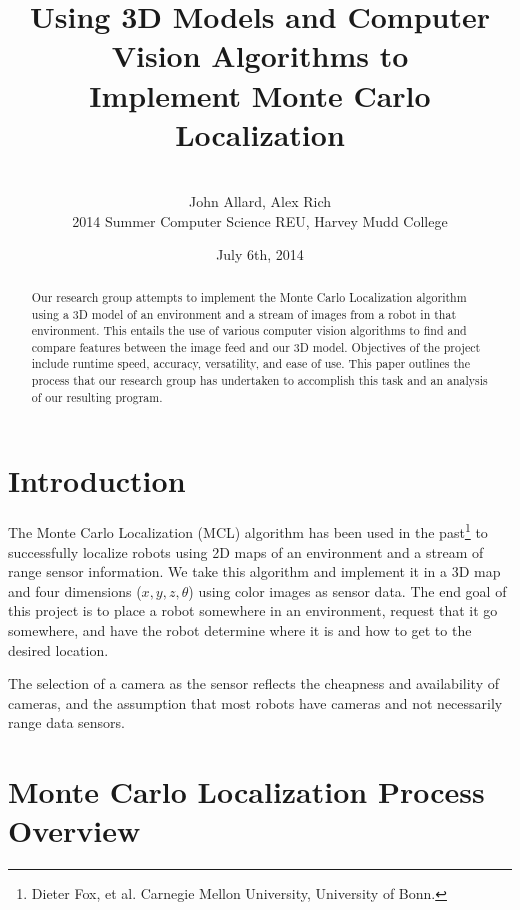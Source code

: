 \documentclass[a4paper,11pt]{article}
\title{Using 3D Models and Computer Vision Algorithms to \\ Implement Monte Carlo Localization}
\author{ \\[7in]  John Allard, Alex Rich \\ 2014 Summer Computer Science REU, Harvey Mudd College}
\date{July 6th, 2014 \\}
\begin{document}
  \maketitle   
  \newpage  
  
  \tableofcontents
  
  \newpage
 
  \begin{abstract}  
  Our research group attempts to implement the Monte Carlo Localization algorithm using a 3D model of an environment and a stream of images from a robot in that environment. This entails the use of various computer vision algorithms to find and compare features between the image feed and our 3D model. Objectives of the project include runtime speed, accuracy, versatility, and ease of use. This paper outlines the process that our research group has undertaken to accomplish this task and an analysis of our resulting program. 
  \end{abstract}
  
  \section{Introduction} 
 The Monte Carlo Localization (MCL) algorithm has been used in the past\footnote{ Dieter Fox, et al. Carnegie Mellon University, University of Bonn.} to successfully localize robots using 2D maps of an environment and a stream of range sensor information. We take this algorithm and implement it in a 3D map and four dimensions ($x, y, z, \theta$) using color images as sensor data. The end goal of this project is to place a robot somewhere in an environment, request that it go somewhere, and have the robot determine where it is and how to get to the desired location.

The selection of a camera as the sensor reflects the cheapness and availability of cameras, and the assumption that most robots have cameras and not necessarily range data sensors.
  
  \section{Monte Carlo Localization Process Overview}
\end{document}
